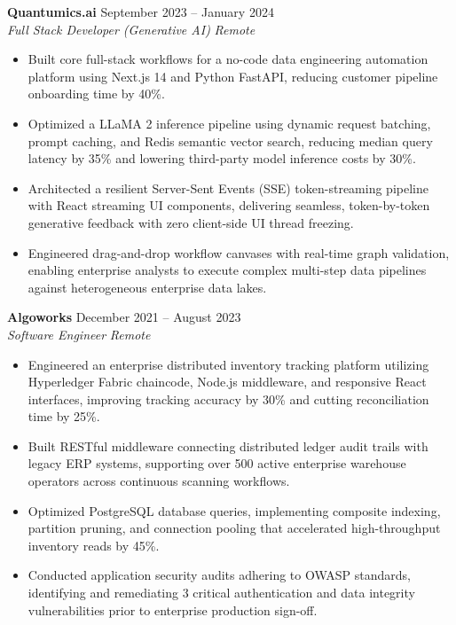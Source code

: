 \documentclass[10pt,a4paper]{article}
\newcommand{\jobheading}[4]{
  \textbf{#1} \hfill #2\\
  \textit{#3} \hfill \textit{#4}\\[-2pt]
}
\begin{document}
\medskip

\jobheading
  {Quantumics.ai}
  {September 2023 -- January 2024}
  {Full Stack Developer (Generative AI)}
  {Remote}

\begin{itemize}
  \item Built core full-stack workflows for a no-code data engineering automation platform using Next.js 14 and Python FastAPI, reducing customer pipeline onboarding time by 40\%.
  \item Optimized a LLaMA 2 inference pipeline using dynamic request batching, prompt caching, and Redis semantic vector search, reducing median query latency by 35\% and lowering third-party model inference costs by 30\%.
  \item Architected a resilient Server-Sent Events (SSE) token-streaming pipeline with React streaming UI components, delivering seamless, token-by-token generative feedback with zero client-side UI thread freezing.
  \item Engineered drag-and-drop workflow canvases with real-time graph validation, enabling enterprise analysts to execute complex multi-step data pipelines against heterogeneous enterprise data lakes.
\end{itemize}

\medskip

\jobheading
  {Algoworks}
  {December 2021 -- August 2023}
  {Software Engineer}
  {Remote}

\begin{itemize}
  \item Engineered an enterprise distributed inventory tracking platform utilizing Hyperledger Fabric chaincode, Node.js middleware, and responsive React interfaces, improving tracking accuracy by 30\% and cutting reconciliation time by 25\%.
  \item Built RESTful middleware connecting distributed ledger audit trails with legacy ERP systems, supporting over 500 active enterprise warehouse operators across continuous scanning workflows.
  \item Optimized PostgreSQL database queries, implementing composite indexing, partition pruning, and connection pooling that accelerated high-throughput inventory reads by 45\%.
  \item Conducted application security audits adhering to OWASP standards, identifying and remediating 3 critical authentication and data integrity vulnerabilities prior to enterprise production sign-off.
\end{itemize}
\end{document}
